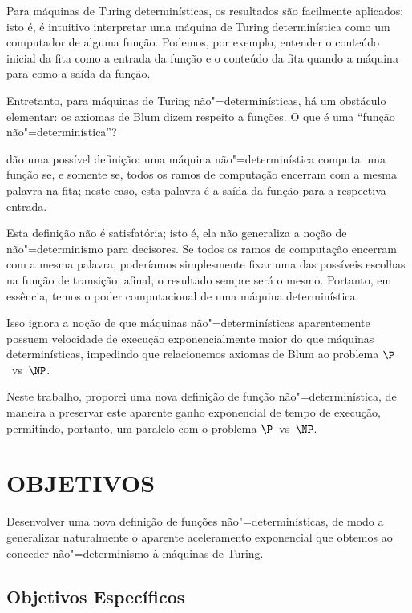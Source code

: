 Para máquinas de Turing determinísticas,
os resultados são facilmente aplicados;
isto é,
é intuitivo interpretar uma máquina de Turing determinística
como um computador de alguma função.
Podemos, por exemplo,
entender o conteúdo inicial da fita como a entrada da função
e o conteúdo da fita quando a máquina para como a saída da função.

Entretanto, para máquinas de Turing não"=determinísticas,
há um obstáculo elementar:
os axiomas de Blum dizem respeito a funções.
O que é uma ``função não"=determinística''?

 dão uma possível definição:
uma máquina não"=determinística computa uma função se,
e somente se,
todos os ramos de computação encerram com a mesma palavra na fita;
neste caso,
esta palavra é a saída da função para a respectiva entrada.

Esta definição não é satisfatória;
isto é, ela não generaliza a noção de não"=determinismo para decisores.
Se todos os ramos de computação encerram com a mesma palavra,
poderíamos simplesmente fixar uma das possíveis escolhas na função de transição;
afinal, o resultado sempre será o mesmo.
Portanto, em essência,
temos o poder computacional de uma máquina determinística.

Isso ignora a noção de que máquinas não"=determinísticas
aparentemente possuem velocidade de execução exponencialmente maior
do que máquinas determinísticas,
impedindo que relacionemos axiomas de Blum
ao problema $\P$~vs~$\NP$.

Neste trabalho,
proporei uma nova definição de função não"=determinística,
de maneira a preservar este aparente ganho exponencial de tempo de execução,
permitindo, portanto,
um paralelo com o problema $\P$~vs~$\NP$.

\section{OBJETIVOS}

Desenvolver uma nova definição de funções não"=determinísticas,
de modo a generalizar naturalmente o aparente aceleramento exponencial
que obtemos ao conceder não"=determinismo à máquinas de Turing.

\subsection[Objetivos específicos]{Objetivos Específicos\footnotemark}

